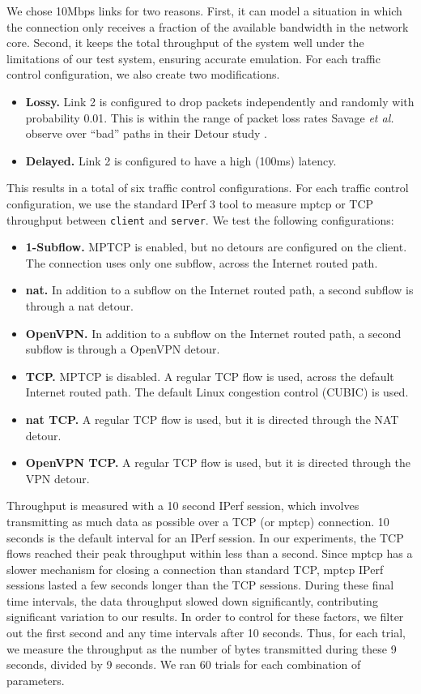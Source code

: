 \documentclass{cwru}
\begin{document}
We chose 10Mbps links for two reasons. First, it can model a situation in which
the connection only receives a fraction of the available bandwidth in the
network core. Second, it keeps the total throughput of the system well under the
limitations of our test system, ensuring accurate emulation. For each traffic
control configuration, we also create two modifications.

\begin{itemize}
\item \textbf{Lossy.} Link 2 is configured to drop packets independently and
  randomly with probability 0.01. This is within the range of packet loss rates
  Savage \textit{et al.} observe over ``bad'' paths in their Detour study
  \cite{detour}.
\item \textbf{Delayed.} Link 2 is configured to have a high (100ms) latency.
\end{itemize}

This results in a total of six traffic control configurations. For each traffic
control configuration, we use the standard IPerf 3 tool to measure \ac{mptcp} or
TCP throughput between \texttt{client} and \texttt{server}. We test the
following configurations:

\begin{itemize}
\item \textbf{1-Subflow.} MPTCP is enabled, but no detours are configured on the
  client. The connection uses only one subflow, across the Internet routed path.
\item \textbf{\ac{nat}.} In addition to a subflow on the Internet routed path, a
  second subflow is through a \ac{nat} detour.
\item \textbf{OpenVPN.} In addition to a subflow on the Internet routed path, a
  second subflow is through a OpenVPN detour.
\item \textbf{TCP.} MPTCP is disabled. A regular TCP flow is used, across the
  default Internet routed path. The default Linux congestion control (CUBIC) is
  used.
\item \textbf{\ac{nat} TCP.} A regular TCP flow is used, but it is directed
  through the NAT detour.
\item \textbf{OpenVPN TCP.} A regular TCP flow is used, but it is directed
  through the VPN detour.
\end{itemize}

Throughput is measured with a 10 second IPerf session, which involves
transmitting as much data as possible over a TCP (or \ac{mptcp}) connection. 10
seconds is the default interval for an IPerf session. In our experiments, the
TCP flows reached their peak throughput within less than a second. Since
\ac{mptcp} has a slower mechanism for closing a connection than standard TCP,
\ac{mptcp} IPerf sessions lasted a few seconds longer than the TCP sessions.
During these final time intervals, the data throughput slowed down
significantly, contributing significant variation to our results. In order to
control for these factors, we filter out the first second and any time intervals
after 10 seconds. Thus, for each trial, we measure the throughput as the number
of bytes transmitted during these 9 seconds, divided by 9 seconds. We ran 60
trials for each combination of parameters.
\end{document}

